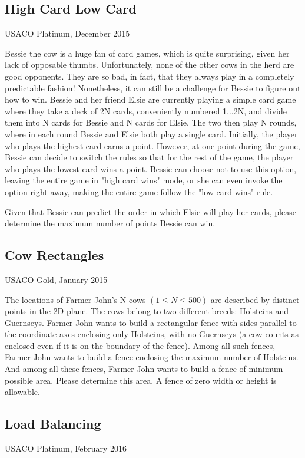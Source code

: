 \documentclass[11pt]{article}
\begin{document}
\subsection{High Card Low Card}
USACO Platinum, December 2015

Bessie the cow is a huge fan of card games, which is quite surprising, given her lack of opposable thumbs. Unfortunately, none of the other cows in the herd are good opponents. They are so bad, in fact, that they always play in a completely predictable fashion! Nonetheless, it can still be a challenge for Bessie to figure out how to win.
Bessie and her friend Elsie are currently playing a simple card game where they take a deck of 2N cards, conveniently numbered 1...2N, and divide them into N cards for Bessie and N cards for Elsie. The two then play N rounds, where in each round Bessie and Elsie both play a single card. Initially, the player who plays the highest card earns a point. However, at one point during the game, Bessie can decide to switch the rules so that for the rest of the game, the player who plays the lowest card wins a point. Bessie can choose not to use this option, leaving the entire game in "high card wins" mode, or she can even invoke the option right away, making the entire game follow the "low card wins" rule.

Given that Bessie can predict the order in which Elsie will play her cards, please determine the maximum number of points Bessie can win.

\subsection{Cow Rectangles}
USACO Gold, January 2015

The locations of Farmer John's N cows $(1\leq N\leq 500)$ are described by
distinct points in the 2D plane.  The cows belong to two different
breeds: Holsteins and Guernseys.  Farmer John wants to build a
rectangular fence with sides parallel to the coordinate axes enclosing
only Holsteins, with no Guernseys (a cow counts as enclosed even if it
is on the boundary of the fence).  Among all such fences, Farmer John
wants to build a fence enclosing the maximum number of Holsteins.  And
among all these fences, Farmer John wants to build a fence of minimum
possible area.  Please determine this area.  A fence of zero width or
height is allowable.




\subsection{Load Balancing}
USACO Platinum, February 2016
\end{document}
